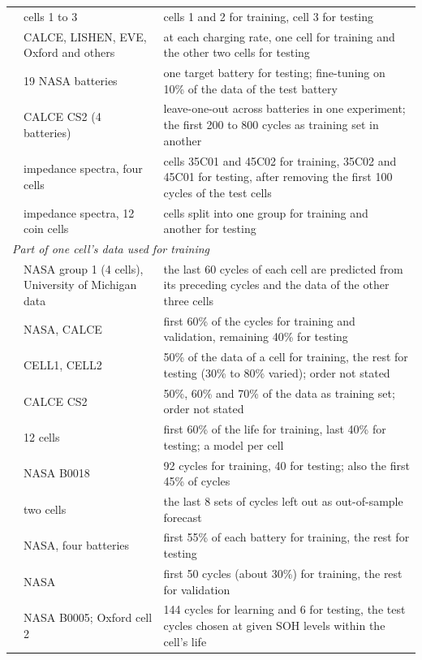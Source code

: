 \documentclass{ieeeaccess}
\begin{document}
\begin{table}[!t]
\begin{tabular}{p{}p{}p{}}
\cite{aud21} & cells 1 to 3 & cells 1 and 2 for training, cell 3 for testing \\
\cite{aud54} & CALCE, LISHEN, EVE, Oxford and others & at each charging rate, one cell for training and the other two cells for testing \\
\cite{aud25} & 19 NASA batteries & one target battery for testing; fine-tuning on 10\% of the data of the test battery \\
\cite{aud44} & CALCE CS2 (4 batteries) & leave-one-out across batteries in one experiment; the first 200 to 800 cycles as training set in another \\
\cite{aud46} & impedance spectra, four cells & cells 35C01 and 45C02 for training, 35C02 and 45C01 for testing, after removing the first 100 cycles of the test cells \\
\cite{aud52} & impedance spectra, 12 coin cells & cells split into one group for training and another for testing \\
\midrule
\multicolumn{3}{l}{\textit{Part of one cell's data used for training}} \\
\cite{aud29} & NASA group 1 (4 cells), University of Michigan data & the last 60 cycles of each cell are predicted from its preceding cycles and the data of the other three cells \\
\cite{aud38} & NASA, CALCE & first 60\% of the cycles for training and validation, remaining 40\% for testing \\
\cite{aud43} & CELL1, CELL2 & 50\% of the data of a cell for training, the rest for testing (30\% to 80\% varied); order not stated \\
\cite{aud17} & CALCE CS2 & 50\%, 60\% and 70\% of the data as training set; order not stated \\
\cite{aud04} & 12 cells & first 60\% of the life for training, last 40\% for testing; a model per cell \\
\cite{aud09} & NASA B0018 & 92 cycles for training, 40 for testing; also the first 45\% of cycles \\
\cite{aud10} & two cells & the last 8 sets of cycles left out as out-of-sample forecast \\
\cite{aud12} & NASA, four batteries & first 55\% of each battery for training, the rest for testing \\
\cite{aud41} & NASA & first 50 cycles (about 30\%) for training, the rest for validation \\
\cite{aud40} & NASA B0005; Oxford cell 2 & 144 cycles for learning and 6 for testing, the test cycles chosen at given SOH levels within the cell's life \\

\end{tabular}
\end{table}
\end{document}
